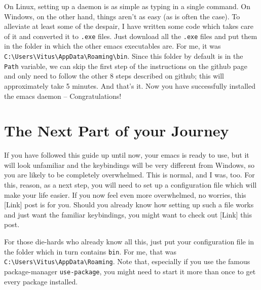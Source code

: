 \documentclass[a4paper, fontsize=11pt, headings=optiontohead, headsepline=true, twoside=false]{scrartcl}
\begin{document}
On Linux, setting up a daemon is as simple as typing in a single
command. On Windows, on the other hand, things aren't as easy (as is
often the case). To alleviate at least some of the despair, I have
written some code which takes care of it and converted it to \texttt{.exe}
files. Just download all the \texttt{.exe} files and put them in the folder in
which the other emacs executables are. For me, it was
\texttt{C:\textbackslash{}Users\textbackslash{}Vitus\textbackslash{}AppData\textbackslash{}Roaming\textbackslash{}bin}. Since this folder by default is in
the \texttt{Path} variable, we can skip the first step of the instructions on
the github page and only need to follow the other 8 steps described on
github; this will approximately take 5 minutes. And that's it. Now you
have successfully installed the emacs daemon -- Congratulations!

\section{The Next Part of your Journey}
\label{sec:org1a2800f}
If you have followed this guide up until now, your emacs is ready to
use, but it will look unfamiliar and the keybindings will be very different
from Windows, so you are likely to be completely overwhelmed. This is
normal, and I was, too. For this, reason, as a next step, you will need
to set up a configuration file which will make your life easier. If
you now feel even more overwhelmed, no worries, this [Link] post is
for you. Should you already know how setting up such a file works and
just want the familiar keybindings, you might want to check out [Link]
this post.

For those die-hards who already know all this, just put your
configuration file in the folder which in turn contains \texttt{bin}. For me, that was
\texttt{C:\textbackslash{}Users\textbackslash{}Vitus\textbackslash{}AppData\textbackslash{}Roaming}. Note that, especially
if you use the famous package-manager \texttt{use-package}, you might need to
start it more than once to get every package installed.
\end{document}
